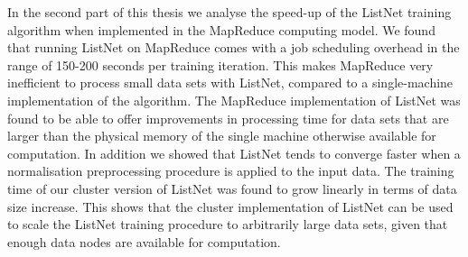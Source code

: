 In the second part of this thesis we analyse the speed-up of the ListNet training algorithm when implemented in the MapReduce computing model. We found that running ListNet on MapReduce comes with a job scheduling overhead in the range of 150-200 seconds per training iteration. This makes MapReduce very inefficient to process small data sets with ListNet, compared to a single-machine implementation of the algorithm. The MapReduce implementation of ListNet was found to be able to offer improvements in processing time for data sets that are larger than the physical memory of the single machine otherwise available for computation. In addition we showed that ListNet tends to converge faster when a normalisation preprocessing procedure is applied to the input data. The training time of our cluster version of ListNet was found to grow linearly in terms of data size increase. This shows that the cluster implementation of ListNet can be used to scale the ListNet training procedure to arbitrarily large data sets, given that enough data nodes are available for computation.

\endgroup			

\vfill